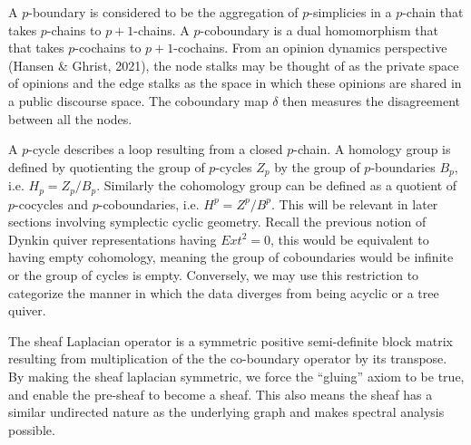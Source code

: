 \documentclass{article}
\theoremstyle{definition}
\begin{document}
A $p$-boundary is considered to be the aggregation of $p$-simplicies in a $p$-chain that takes $p$-chains to $p+1$-chains. A $p$-coboundary is a dual homomorphism that that takes $p$-cochains to $p+1$-cochains.  From an opinion dynamics perspective (Hansen \& Ghrist, 2021), the node stalks may be thought of as the private space of opinions and the edge stalks as the space in which these opinions are shared in a public discourse space. The coboundary map $\delta$ then measures the disagreement between all the nodes. 

A $p$-cycle describes a loop resulting from a closed $p$-chain. A homology group is defined by quotienting the group of $p$-cycles $Z_p$ by the group of $p$-boundaries $B_p$, i.e. $H_p = Z_p / B_p$. Similarly the cohomology group can be defined as a quotient of $p$-cocycles and $p$-coboundaries, i.e. $H^p = Z^p / B^p$. This will be relevant in later sections involving symplectic cyclic geometry.
Recall the previous notion of Dynkin quiver representations having $Ext^2=0$, this would be equivalent to having empty cohomology, meaning the group of coboundaries would be infinite or the group of cycles is empty. Conversely, we may use this restriction to categorize the manner in which the data diverges from being acyclic or a tree quiver.



The sheaf Laplacian operator is a symmetric positive semi-definite block matrix resulting from multiplication of the the co-boundary operator by its transpose. By making the sheaf laplacian symmetric, we force the ``gluing'' axiom to be true, and enable the pre-sheaf to become a sheaf. This also means the sheaf has a similar undirected nature as the underlying graph and makes spectral analysis possible.
\end{document}
